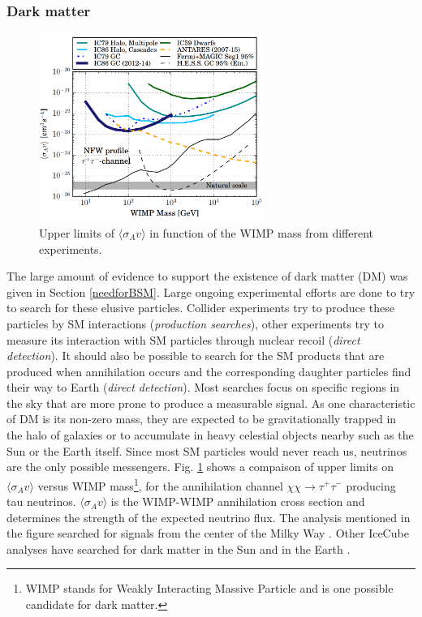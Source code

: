 \subsubsection{Dark matter}

\begin{figure}[ht]
\centering
\includegraphics[width=0.65\textwidth]{chapter5/img/dm.png}
\caption{Upper limits of $\langle \sigma_A v\rangle$ in function of the WIMP mass from different experiments.}
\label{fig:dm}
\end{figure}

The large amount of evidence to support the existence of dark matter (DM) was given in Section \ref{needforBSM}. Large ongoing experimental efforts are done to try to search for these elusive particles. Collider experiments try to produce these particles by SM interactions (\textit{production searches}), other experiments try to measure its interaction with SM particles through nuclear recoil (\textit{direct detection}). It should also be possible to search for the SM products that are produced when annihilation occurs and the corresponding daughter particles find their way to Earth (\textit{direct detection}). Most searches focus on specific regions in the sky that are more prone to produce a measurable signal. As one characteristic of DM is its non-zero mass, they are expected to be gravitationally trapped in the halo of galaxies or to accumulate in heavy celestial objects nearby such as the Sun or the Earth itself. Since most SM particles would never reach us, neutrinos are the only possible messengers. Fig. \ref{fig:dm} shows a compaison of upper limits on $\langle \sigma_A v\rangle$ versus WIMP mass\footnote{WIMP stands for Weakly Interacting Massive Particle and is one possible candidate for dark matter.}, for the annihilation channel $\chi \chi \rightarrow \tau^+ \tau^-$ producing tau neutrinos. $\langle \sigma_A v\rangle$ is the WIMP-WIMP annihilation cross section and determines the strength of the expected neutrino flux. The analysis mentioned in the figure searched for signals from the center of the Milky Way \cite{Aartsen:2017ulx}. Other IceCube analyses have searched for dark matter in the Sun \cite{Aartsen:2016zhm,Abbasi:2009vg} and in the Earth \cite{Aartsen:2016fep}.

